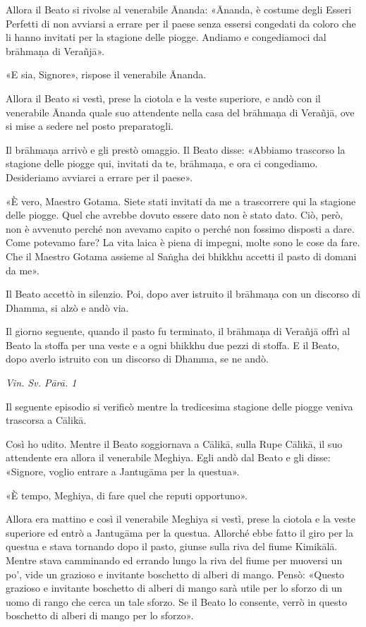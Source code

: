 Allora il Beato si rivolse al venerabile Ānanda: «Ānanda, è costume
degli Esseri Perfetti di non avviarsi a errare per il paese senza
essersi congedati da coloro che li hanno invitati per la stagione delle
piogge. Andiamo e congediamoci dal brāhmaṇa di Verañjā».


«E sia, Signore», rispose il venerabile Ānanda.


Allora il Beato si vestì, prese la ciotola e la veste superiore, e andò
con il venerabile Ānanda quale suo attendente nella casa del brāhmaṇa di
Verañjā, ove si mise a sedere nel posto preparatogli.


Il brāhmaṇa arrivò e gli prestò omaggio. Il Beato disse: «Abbiamo
trascorso la stagione delle piogge qui, invitati da te, brāhmaṇa, e ora
ci congediamo. Desideriamo avviarci a errare per il paese».


«È vero, Maestro Gotama. Siete stati invitati da me a trascorrere qui la
stagione delle piogge. Quel che avrebbe dovuto essere dato non è stato
dato. Ciò, però, non è avvenuto perché non avevamo capito o perché non
fossimo disposti a dare. Come potevamo fare? La vita laica è piena di
impegni, molte sono le cose da fare. Che il Maestro Gotama assieme al
Saṅgha dei bhikkhu accetti il pasto di domani da me».


Il Beato accettò in silenzio. Poi, dopo aver istruito il brāhmaṇa con un
discorso di Dhamma, si alzò e andò via.


Il giorno seguente, quando il pasto fu terminato, il brāhmaṇa di Verañjā
offrì al Beato la stoffa per una veste e a ogni bhikkhu due pezzi di
stoffa. E il Beato, dopo averlo istruito con un discorso di Dhamma, se
ne andò.


\emph{Vin. Sv. Pārā. 1}


 Il seguente episodio si verificò mentre la
tredicesima stagione delle piogge veniva trascorsa a Cālikā.


 Così ho udito. Mentre il Beato soggiornava a Cālikā, sulla
Rupe Cālikā, il suo attendente era allora il venerabile Meghiya. Egli
andò dal Beato e gli disse: «Signore, voglio entrare a Jantugāma per la
questua».


«È tempo, Meghiya, di fare quel che reputi opportuno».


Allora era mattino e così il venerabile Meghiya si vestì, prese la
ciotola e la veste superiore ed entrò a Jantugāma per la questua.
Allorché ebbe fatto il giro per la questua e stava tornando dopo il
pasto, giunse sulla riva del fiume Kimikālā. Mentre stava camminando ed
errando lungo la riva del fiume per muoversi un po’, vide un grazioso e
invitante boschetto di alberi di mango. Pensò: «Questo grazioso e
invitante boschetto di alberi di mango sarà utile per lo sforzo di un
uomo di rango che cerca un tale sforzo. Se il Beato lo consente, verrò
in questo boschetto di alberi di mango per lo sforzo».


